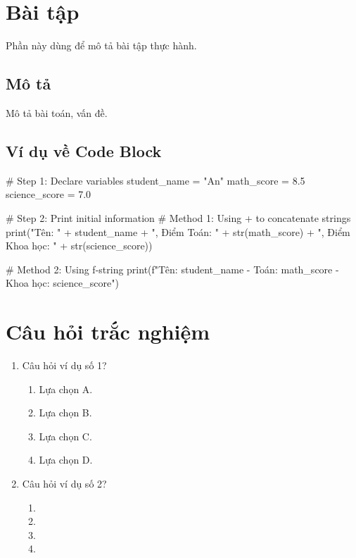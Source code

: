 \documentclass[12pt]{article}
\newcounter{choice}
\begin{document}
\section{Bài tập}
\label{section:practice}

Phần này dùng để mô tả bài tập thực hành.

\subsection{Mô tả}
Mô tả bài toán, vấn đề.

\subsection{Ví dụ về Code Block}

\begin{aivncodebox}
\begin{python}
# Step 1: Declare variables
student_name = "An"
math_score = 8.5
science_score = 7.0

# Step 2: Print initial information
# Method 1: Using + to concatenate strings
print("Tên: " + student_name + ", Điểm Toán: " + str(math_score) + ", Điểm Khoa học: " + str(science_score))

# Method 2: Using f-string
print(f"Tên: {student_name} - Toán: {math_score} - Khoa học: {science_score}")
\end{python}
\end{aivncodebox}



\newpage
\section{Câu hỏi trắc nghiệm}
\label{section:multiplechoices}

\begin{enumerate}[leftmargin=*]
    \item Câu hỏi ví dụ số 1?
    \begin{enumerate}[label=(\alph*)]
        \item Lựa chọn A.
        \item Lựa chọn B.
        \item Lựa chọn C.
        \item Lựa chọn D.
    \end{enumerate}

    \item Câu hỏi ví dụ số 2?
    \begin{enumerate}[label=(\alph*)]
        \item {}
        \item {}
        \item {}
        \item {}
    \end{enumerate}
\end{enumerate}
\end{document}
